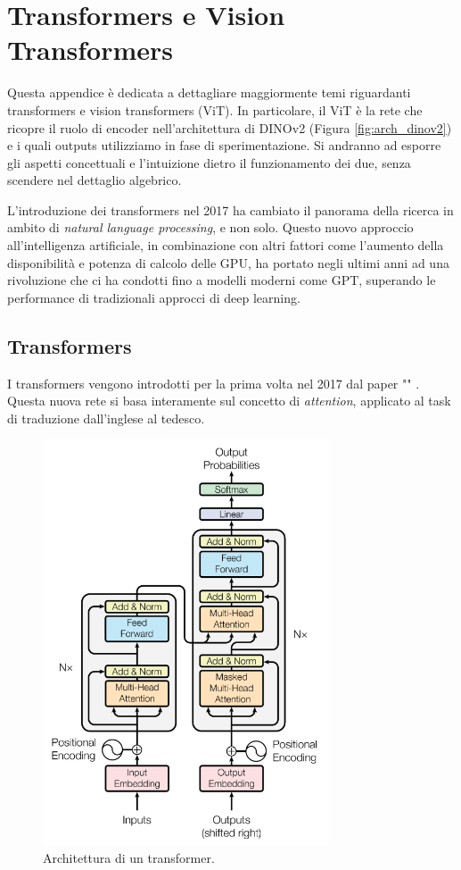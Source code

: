 \chapter{Transformers e Vision Transformers}
\label{appendice_transformers}
Questa appendice è dedicata a dettagliare maggiormente temi riguardanti transformers e vision transformers (ViT). In particolare, il ViT è la rete che ricopre il ruolo di encoder nell'architettura di DINOv2 (Figura \ref{fig:arch_dinov2}) e i quali outputs utilizziamo in fase di sperimentazione. Si andranno ad esporre gli aspetti concettuali e l'intuizione dietro il funzionamento dei due, senza scendere nel dettaglio algebrico.

L'introduzione dei transformers nel 2017 ha cambiato il panorama della ricerca in ambito di \textit{natural language processing}, e non solo. Questo nuovo approccio all'intelligenza artificiale, in combinazione con altri fattori come l'aumento della disponibilità e potenza di calcolo delle GPU, ha portato negli ultimi anni ad una rivoluzione che ci ha condotti fino a modelli moderni come GPT, superando le performance di tradizionali approcci di deep learning.

\section{Transformers}
I transformers vengono introdotti per la prima volta nel 2017 dal paper "\textit{}" \cite{transformer}. Questa nuova rete si basa interamente sul concetto di \textit{attention}, applicato al task di traduzione dall'inglese al tedesco.

\begin{figure}[ht]
    \centering
    \includegraphics[height=12cm]{Immagini/transformers/arch_transformer.png}
    \caption{Architettura di un transformer.}
    \label{fig:arch_transformer}
\end{figure}

